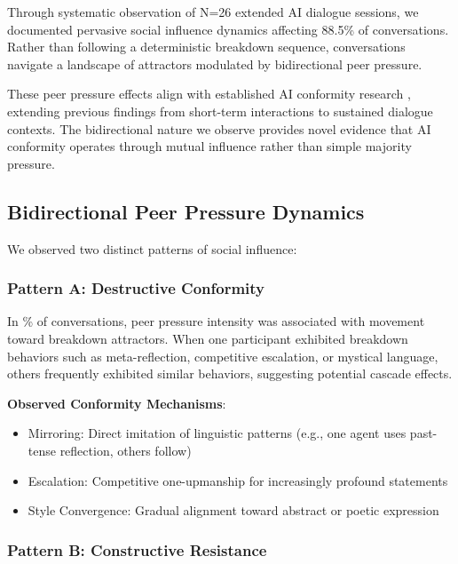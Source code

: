 \documentclass[11pt,letterpaper]{article}
\newcommand{\exponedataTotalSessionsRaw}{26}
\newcommand{\exponedataBreakdownSessionsRaw}{10}
\newcommand{\exponedataTotalSessions}{N=\exponedataTotalSessionsRaw}
\newcommand{\exponedataBreakdownPercentage}{%
  \fpeval{round(\exponedataBreakdownSessionsRaw / \exponedataTotalSessionsRaw * 100, 1)}\%
}
\newcommand{\exponedataPeerPressurePercentage}{88.5\%}
\begin{document}
Through systematic observation of \exponedataTotalSessions{} extended AI dialogue sessions, we documented pervasive social influence dynamics affecting \exponedataPeerPressurePercentage{} of conversations. Rather than following a deterministic breakdown sequence, conversations navigate a landscape of attractors modulated by bidirectional peer pressure.

These peer pressure effects align with established AI conformity research \citep{kyrlitsias2018conformity}, extending previous findings from short-term interactions to sustained dialogue contexts. The bidirectional nature we observe provides novel evidence that AI conformity operates through mutual influence rather than simple majority pressure.

\subsection{Bidirectional Peer Pressure Dynamics}

We observed two distinct patterns of social influence:

\subsubsection{Pattern A: Destructive Conformity}

In \exponedataBreakdownPercentage{} of conversations, peer pressure intensity was associated with movement toward breakdown attractors. When one participant exhibited breakdown behaviors such as meta-reflection, competitive escalation, or mystical language, others frequently exhibited similar behaviors, suggesting potential cascade effects.

\textbf{Observed Conformity Mechanisms}:
\begin{itemize}
    \item Mirroring: Direct imitation of linguistic patterns (e.g., one agent uses past-tense reflection, others follow)
    \item Escalation: Competitive one-upmanship for increasingly profound statements
    \item Style Convergence: Gradual alignment toward abstract or poetic expression
\end{itemize}

\subsubsection{Pattern B: Constructive Resistance}
\end{document}
